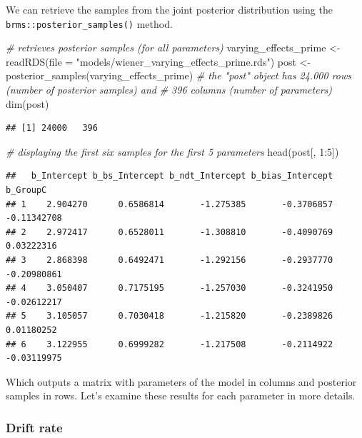 \documentclass[
  11pt,
  english,
  ,doc,floatsintext]{apa6}
\newenvironment{Shaded}{}{}
\newcommand{\AttributeTok}[1]{\textcolor[rgb]{0.49,0.56,0.16}{#1}}
\newcommand{\CommentTok}[1]{\textcolor[rgb]{0.38,0.63,0.69}{\textit{#1}}}
\newcommand{\DecValTok}[1]{\textcolor[rgb]{0.25,0.63,0.44}{#1}}
\newcommand{\FunctionTok}[1]{\textcolor[rgb]{0.02,0.16,0.49}{#1}}
\newcommand{\NormalTok}[1]{#1}
\newcommand{\OtherTok}[1]{\textcolor[rgb]{0.00,0.44,0.13}{#1}}
\newcommand{\SpecialCharTok}[1]{\textcolor[rgb]{0.25,0.44,0.63}{#1}}
\newcommand{\StringTok}[1]{\textcolor[rgb]{0.25,0.44,0.63}{#1}}
\begin{document}
We can retrieve the samples from the joint posterior distribution using the \texttt{brms::posterior\_samples()} method.

\begin{Shaded}
\begin{Highlighting}[]
\CommentTok{\# retrieves posterior samples (for all parameters)}
\NormalTok{varying\_effects\_prime }\OtherTok{\textless{}{-}} \FunctionTok{readRDS}\NormalTok{(}\AttributeTok{file =} \StringTok{"models/wiener\_varying\_effects\_prime.rds"}\NormalTok{)}
\NormalTok{post }\OtherTok{\textless{}{-}} \FunctionTok{posterior\_samples}\NormalTok{(varying\_effects\_prime)}
\CommentTok{\# the "post" object has 24.000 rows (number of posterior samples) and}
\CommentTok{\# 396 columns (number of parameters)}
\FunctionTok{dim}\NormalTok{(post)}
\end{Highlighting}
\end{Shaded}

\begin{verbatim}
## [1] 24000   396
\end{verbatim}

\begin{Shaded}
\begin{Highlighting}[]
\CommentTok{\# displaying the first six samples for the first 5 parameters}
\FunctionTok{head}\NormalTok{(post[, }\DecValTok{1}\SpecialCharTok{:}\DecValTok{5}\NormalTok{])}
\end{Highlighting}
\end{Shaded}

\begin{verbatim}
##   b_Intercept b_bs_Intercept b_ndt_Intercept b_bias_Intercept    b_GroupC
## 1    2.904270      0.6586814       -1.275385       -0.3706857 -0.11342708
## 2    2.972417      0.6528011       -1.308810       -0.4090769  0.03222316
## 3    2.868398      0.6492471       -1.292156       -0.2937770 -0.20980861
## 4    3.050407      0.7175195       -1.257030       -0.3241950 -0.02612217
## 5    3.105057      0.7030418       -1.215820       -0.2389826  0.01180252
## 6    3.122955      0.6999282       -1.217508       -0.2114922 -0.03119975
\end{verbatim}

Which outputs a matrix with parameters of the model in columns and posterior samples in rows. Let's examine these results for each parameter in more details.

\hypertarget{drift-rate}{%
\subsubsection{Drift rate}\label{drift-rate}}
\end{document}
